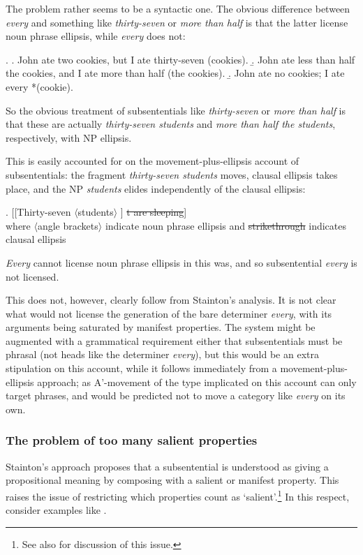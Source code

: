 \documentclass[doublespace]{umthesis}
\begin{document}
The problem rather seems to be a syntactic one. The obvious difference between {\it every} and something like {\it thirty-seven} or {\it more than half} is that the latter license noun phrase ellipsis, while {\it every} does not:

\ex. 	\a. John ate two cookies, but I ate thirty-seven (cookies).
	\b. John ate less than half the cookies, and I ate more than half (the cookies).
	\b. John ate no cookies; I ate every *(cookie).

So the obvious treatment of subsententials like {\it thirty-seven} or {\it more than half} is that these are actually {\it thirty-seven students} and {\it more than half the students}, respectively, with NP ellipsis.

This is easily accounted for on the movement-plus-ellipsis account of subsententials: the fragment {\it thirty-seven students} moves, clausal ellipsis takes place, and the NP {\it students} elides independently of the clausal ellipsis:

\ex. 	[[Thirty-seven $\langle$students$\rangle$ ] \sout{t are sleeping}]\\
	where $\langle$angle brackets$\rangle$ indicate noun phrase ellipsis and \sout{strikethrough} indicates clausal ellipsis
	
{\it Every} cannot license noun phrase ellipsis in this was, and so subsentential {\it every} is not licensed.

This does not, however, clearly follow from Stainton's analysis. It is not clear what would not license the generation of the bare determiner {\it every}, with its arguments being saturated by manifest properties. The system might be augmented with a grammatical requirement either that subsententials must be phrasal (not heads like the determiner {\it every}), but this would be an extra stipulation on this account, while it follows immediately from a movement-plus-ellipsis approach; as A'-movement of the type implicated on this account can only target phrases, and would be predicted not to move a category like {\it every} on its own.



\subsubsection{The problem of too many salient properties}\label{sec-too-many-salient-properties}

Stainton's approach proposes that a subsentential is understood as giving a propositional meaning by composing with a salient or manifest property. This raises the issue of restricting which properties count as `salient'.\footnote{See also \cite[sec. 2]{Me10} for discussion of this issue.} In this respect, consider examples like \Next.
\end{document}
